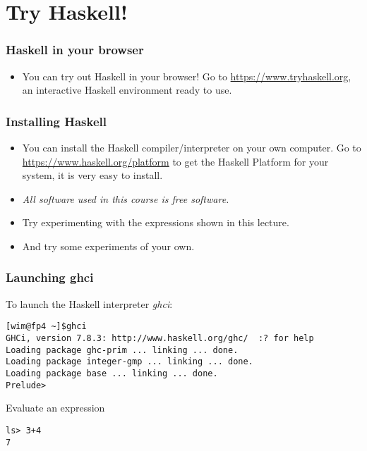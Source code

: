\documentclass{beamer}
\begin{document}
\section{Try Haskell!}




\begin{frame}
\frametitle{Haskell in your browser}

\begin{itemize}
\item You can try out Haskell in your browser! Go to \url{https://www.tryhaskell.org}, an interactive Haskell environment ready to use.
\end{itemize}

\end{frame}

\begin{frame}
\frametitle{Installing Haskell}

\begin{itemize}
\item  You can install the Haskell compiler/interpreter on your own computer. Go to \url{https://www.haskell.org/platform} to get the Haskell Platform for your system, it is very easy to install.

\item \emph{All software used in this course is free software.}
\item Try experimenting with the expressions shown in this lecture.
\item And try some experiments of your own.
\end{itemize}


\end{frame}


\begin{frame}[fragile]
\frametitle{Launching ghci}

To launch the  Haskell interpreter \emph{ghci}:
{\footnotesize
\begin{verbatim}
[wim@fp4 ~]$ghci
GHCi, version 7.8.3: http://www.haskell.org/ghc/  :? for help
Loading package ghc-prim ... linking ... done.
Loading package integer-gmp ... linking ... done.
Loading package base ... linking ... done.
Prelude> 
\end{verbatim}
}

Evaluate an expression

\begin{verbatim}
ls> 3+4
7
\end{verbatim}

\end{frame}
\end{document}

